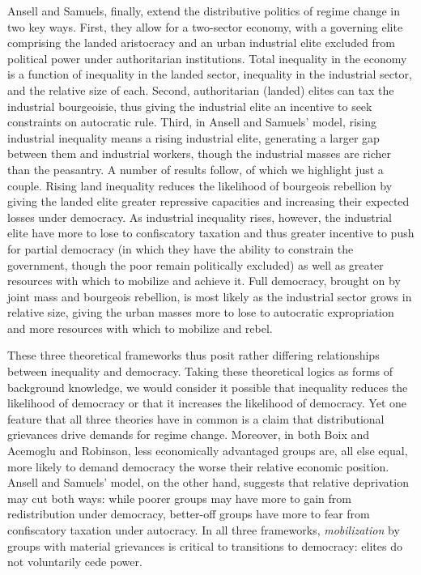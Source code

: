 \documentclass[
  12pt,
]{book}
\begin{document}
Ansell and Samuels, finally, extend the distributive politics of regime change in two key ways. First, they allow for a two-sector economy, with a governing elite comprising the landed aristocracy and an urban industrial elite excluded from political power under authoritarian institutions. Total inequality in the economy is a function of inequality in the landed sector, inequality in the industrial sector, and the relative size of each. Second, authoritarian (landed) elites can tax the industrial bourgeoisie, thus giving the industrial elite an incentive to seek constraints on autocratic rule. Third, in Ansell and Samuels' model, rising industrial inequality means a rising industrial elite, generating a larger gap between them and industrial workers, though the industrial masses are richer than the peasantry. A number of results follow, of which we highlight just a couple. Rising land inequality reduces the likelihood of bourgeois rebellion by giving the landed elite greater repressive capacities and increasing their expected losses under democracy. As industrial inequality rises, however, the industrial elite have more to lose to confiscatory taxation and thus greater incentive to push for partial democracy (in which they have the ability to constrain the government, though the poor remain politically excluded) as well as greater resources with which to mobilize and achieve it. Full democracy, brought on by joint mass and bourgeois rebellion, is most likely as the industrial sector grows in relative size, giving the urban masses more to lose to autocratic expropriation and more resources with which to mobilize and rebel.

These three theoretical frameworks thus posit rather differing relationships between inequality and democracy. Taking these theoretical logics as forms of background knowledge, we would consider it possible that inequality reduces the likelihood of democracy or that it increases the likelihood of democracy. Yet one feature that all three theories have in common is a claim that distributional grievances drive demands for regime change. Moreover, in both Boix and Acemoglu and Robinson, less economically advantaged groups are, all else equal, more likely to demand democracy the worse their relative economic position. Ansell and Samuels' model, on the other hand, suggests that relative deprivation may cut both ways: while poorer groups may have more to gain from redistribution under democracy, better-off groups have more to fear from confiscatory taxation under autocracy. In all three frameworks, \emph{mobilization} by groups with material grievances is critical to transitions to democracy: elites do not voluntarily cede power.
\end{document}

